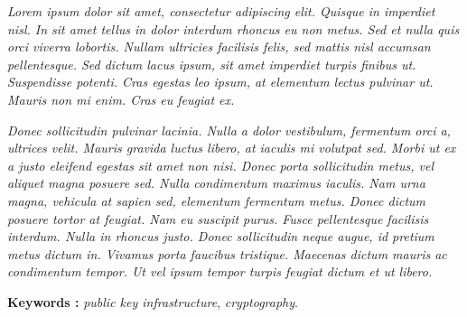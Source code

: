 \documentclass{sttnfskripsi}
\begin{document}
\begin{abstracteng}
\emph{
Lorem ipsum dolor sit amet, consectetur adipiscing elit. Quisque in imperdiet nisl. In sit amet tellus in dolor interdum rhoncus eu non metus. Sed et nulla quis orci viverra lobortis. Nullam ultricies facilisis felis, sed mattis nisl accumsan pellentesque. Sed dictum lacus ipsum, sit amet imperdiet turpis finibus ut. Suspendisse potenti. Cras egestas leo ipsum, at elementum lectus pulvinar ut. Mauris non mi enim. Cras eu feugiat ex.}

\emph{
Donec sollicitudin pulvinar lacinia. Nulla a dolor vestibulum, fermentum orci a, ultrices velit. Mauris gravida luctus libero, at iaculis mi volutpat sed. Morbi ut ex a justo eleifend egestas sit amet non nisi. Donec porta sollicitudin metus, vel aliquet magna posuere sed. Nulla condimentum maximus iaculis. Nam urna magna, vehicula at sapien sed, elementum fermentum metus. Donec dictum posuere tortor at feugiat. Nam eu suscipit purus. Fusce pellentesque facilisis interdum. Nulla in rhoncus justo. Donec sollicitudin neque augue, id pretium metus dictum in. Vivamus porta faucibus tristique. Maecenas dictum mauris ac condimentum tempor. Ut vel ipsum tempor turpis feugiat dictum et ut libero.
}

\bigskip
\noindent
\textbf{Keywords :} \emph{public key infrastructure}, \emph{cryptography}.
\end{abstracteng}














\end{document}
